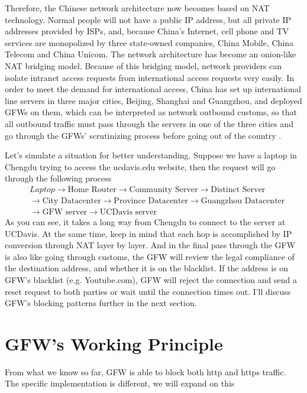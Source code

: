 \documentclass[11pt]{article}
\begin{document}
Therefore, the Chinese network architecture now becomes based on NAT technology.
Normal people will not have a public IP address, but all private IP
addresses provided by ISPs, and, because China's Internet, cell phone and TV
services are monopolized by three state-owned companies, China Mobile, China
Telecom and China Unicom. The network architecture has become an onion-like NAT
bridging model. Because of this bridging model, network providers can isolate
intranet access requests from international access requests very easily. In
order to meet the demand for international access, China has set up
international line servers in three major cities, Beijing, Shanghai and
Guangzhou, and deployed GFWs on them, which can be interpreted as network
outbound customs, so that all outbound traffic must pass through the servers in
one of the three cities and go through the GFWs' scrutinizing process before
going out of the country \cite{GlobalNetServer}.

Let's simulate a situation for better understanding. Suppose we have a laptop in
Chengdu trying to access the ucdavis.edu website, then the request will go
through the following process
\begin{align*} &Laptop \rightarrow \text{Home Router} \rightarrow
\text{Community Server} \rightarrow \text{Distinct Server}\\ &\rightarrow
\text{City Datacenter} \rightarrow \text{Province Datacenter} \rightarrow
\text{Guangzhou Datacenter}\\ &\rightarrow \text{GFW server} \rightarrow
\text{UCDavis server} \end{align*}
As you can see, it takes a long way from Chengdu to connect to the server at UCDavis.
At the same time, keep in mind that each hop is accomplished by IP conversion
through NAT layer by layer. And in the final pass through the GFW is also like
going through customs, the GFW will review the legal compliance of the
destination address, and whether it is on the blacklist. If the address is on
GFW's blacklist (e.g. Youtube.com), GFW will reject the connection and send a
reset request to both parties or wait until the connection times out. I'll
discuss GFW's blocking patterns further in the next section.

\section{GFW's Working Principle}
From what we know so far, GFW is able to block both http and https traffic. The
specific implementation is different, we will expand on this
\end{document}
